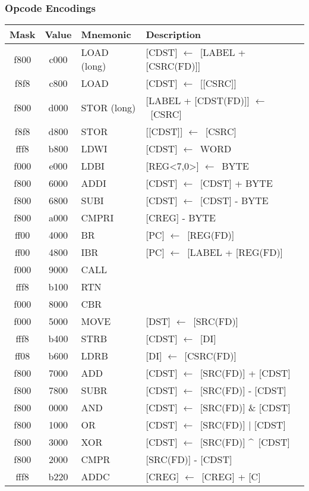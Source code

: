 \documentclass[hidelinks,11pt]{article}
\newcommand{\tn}[1]{\textnormal{#1}}
\newcommand{\la}{$\leftarrow$}
\begin{document}
\subsubsection{Opcode Encodings}
{
  \centering
  \begin{tabular}{|C|C|L|P{0.5\textwidth}|}
    \hline
    \tn{Mask} & \tn{Value} & \tn{Mnemonic} & \tn{Description} \\
    \hline
    f800 & c000 & LOAD \tn{(long)} & [CDST] \la\ [LABEL + [CSRC(FD)]] \\
    f8f8 & c800 & LOAD & [CDST] \la\ [[CSRC]] \\
    f800 & d000 & STOR \tn{(long)} & [LABEL + [CDST(FD)]] \la\ [CSRC] \\
    f8f8 & d800 & STOR & [[CDST]] \la\ [CSRC] \\
    \hline
    fff8 & b800 & LDWI & [CDST] \la\ WORD \\
    f000 & e000 & LDBI & [REG<7,0>] \la\ BYTE \\
    \hline
    f800 & 6000 & ADDI & [CDST] \la\ [CDST] + BYTE \\
    f800 & 6800 & SUBI & [CDST] \la\ [CDST] - BYTE \\
    f800 & a000 & CMPRI & [CREG] - BYTE \\
    \hline
    ff00 & 4000 & BR & [PC] \la\ [REG(FD)] \\
    ff00 & 4800 & IBR & [PC] \la\ [LABEL + [REG(FD)] \\
    f000 & 9000 & CALL & \\
    fff8 & b100 & RTN & \\
    f000 & 8000 & CBR & \\
    \hline
    f000 & 5000 & MOVE & [DST] \la\ [SRC(FD)] \\
    fff8 & b400 & STRB & [CDST] \la\ [DI] \\
    ff08 & b600 & LDRB & [DI] \la\ [CSRC(FD)] \\
    \hline
    f800 & 7000 & ADD & [CDST] \la\ [SRC(FD)] + [CDST] \\
    f800 & 7800 & SUBR & [CDST] \la\ [SRC(FD)] - [CDST] \\
    f800 & 0000 & AND & [CDST] \la\ [SRC(FD)] \& [CDST] \\
    f800 & 1000 & OR & [CDST] \la\ [SRC(FD)] | [CDST] \\
    f800 & 3000 & XOR & [CDST] \la\ [SRC(FD)] \textasciicircum\ [CDST] \\
    f800 & 2000 & CMPR & [SRC(FD)] - [CDST] \\
    \hline
    fff8 & b220 & ADDC & [CREG] \la\ [CREG] + [C] \\

\end{tabular}}
\end{document}
